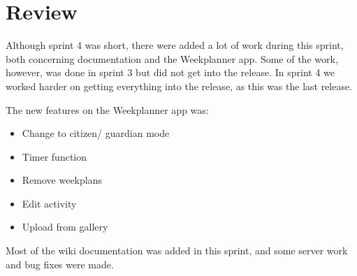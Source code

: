 \section{Review}
Although sprint 4 was short, there were added a lot of work during this sprint, both concerning documentation and the Weekplanner app. Some of the work, however, was done in sprint 3 but did not get into the release. In sprint 4 we worked harder on getting everything into the release, as this was the last release. 

The new features on the Weekplanner app was:
\begin{itemize}
    \item Change to citizen/ guardian mode
    \item Timer function
    \item Remove weekplans
    \item Edit activity
    \item Upload from gallery
\end{itemize}

Most of the wiki documentation was added in this sprint, and some server work and bug fixes were made. 